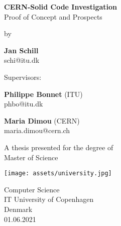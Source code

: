 \documentclass[runningheads]{llncs}
\begin{document}
\begin{titlepage}
   \begin{center}
       \vspace*{1cm}
       \Huge
       \textbf{CERN-Solid Code Investigation}\\
       \LARGE
       \vspace{0.5cm}
        Proof of Concept and Prospects\\
        
       \vspace{1cm}
       
       \normalsize
        by\\
        
       \vspace{1cm}
       
       \Large
       \textbf{Jan Schill}\\
        schi@itu.dk
        
       \vfill
       
       \normalsize
        Supervisors:\\
        
       \vspace{0.3cm}
       
       \textbf{Philippe Bonnet} (ITU)\\
        phbo@itu.dk
        
       \vspace{0.3cm}
       
       \textbf{Maria Dimou} (CERN)\\
        maria.dimou@cern.ch
        
       
       \vspace{1cm}
       
        A thesis presented for the degree of\\
        Master of Science
        
       \vspace{1.5cm}
       
       \texttt{[image: assets/university.jpg]}
       
       Computer Science\\
       IT University of Copenhagen\\
       Denmark\\
       01.06.2021
            
   \end{center}
\end{titlepage}


\tableofcontents
\newpage






\printglossary[type=\acronymtype]
\newpage
\printglossary
\newpage
\printbibliography
\end{document}
